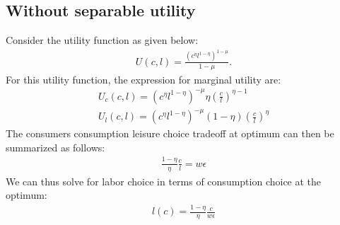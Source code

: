 \documentclass[12pt]{article}
\begin{document}
\subsection{Without separable utility}
Consider the utility function as given below:
\begin{align*}
U(c, l) = \frac{(c^\eta l^{1-\eta})^{1-\mu}}{1-\mu}.
\end{align*}
For this utility function, the expression for marginal utility are:
\begin{align*}
U_c(c, l) = (c^\eta l^{1-\eta})^{-\mu} \eta (\frac{c}{l})^{\eta -1} \\
U_l(c, l) = (c^\eta l^{1-\eta})^{-\mu} (1-\eta) (\frac{c}{l})^{\eta}
\end{align*}
The consumers consumption leisure choice tradeoff at optimum can then be summarized as follows:
\begin{align*}
\frac{1-\eta}{\eta}\frac{c}{l}  = w\epsilon 
\end{align*}
We can thus solve for labor choice in terms of consumption choice at the optimum:
\begin{align*}
l(c) = \frac{1-\eta}{\eta}\frac{c}{w\epsilon }
\end{align*}
\end{document}
